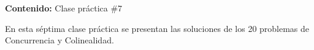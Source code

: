 {\Large
    \textbf{Contenido:} Clase práctica \#7
}

En esta séptima clase práctica se presentan las soluciones de los 20 problemas de Concurrencia y Colinealidad.